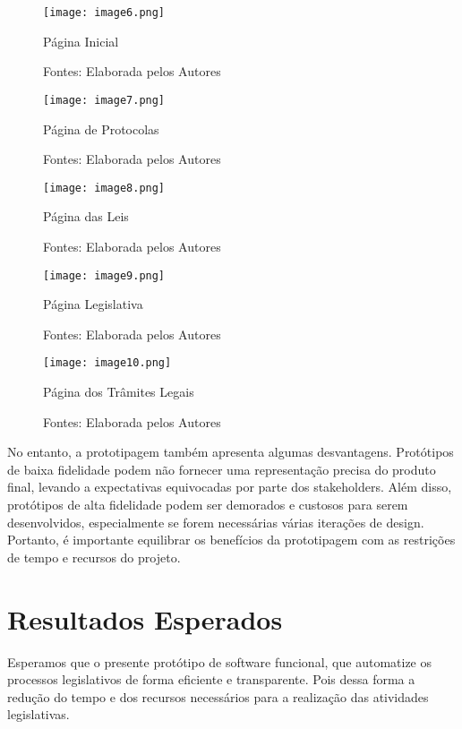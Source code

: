 \documentclass[12pt]{article}
\begin{document}
\begin{figure}[H]
	\centering
	\texttt{[image: image6.png]}
	\caption{Página Inicial}
	\caption*{Fontes: Elaborada pelos Autores}
	\label{fig:pagina-inicial}
\end{figure}

\begin{figure}[H]
	\centering
	\texttt{[image: image7.png]}
	\caption{Página de Protocolas}
	\caption*{Fontes: Elaborada pelos Autores}
	\label{fig:pagina-protocolas}
\end{figure}

\begin{figure}[H]
	\centering
	\texttt{[image: image8.png]}
	\caption{Página das Leis}
	\caption*{Fontes: Elaborada pelos Autores}
	\label{fig:pagina-leis}
\end{figure}

\begin{figure}[H]
	\centering
	\texttt{[image: image9.png]}
	\caption{Página Legislativa}
	\caption*{Fontes: Elaborada pelos Autores}
	\label{fig:pagina-legislativa}
\end{figure}

\begin{figure}[H]
	\centering
	\texttt{[image: image10.png]}
	\caption{Página dos Trâmites Legais}
	\caption*{Fontes: Elaborada pelos Autores}
	\label{fig:pagina-tramites-legais}
\end{figure}

No entanto, a prototipagem também apresenta algumas desvantagens. Protótipos de baixa fidelidade podem não fornecer uma representação precisa do produto final, levando a expectativas equivocadas por parte dos stakeholders. Além disso, protótipos de alta fidelidade podem ser demorados e custosos para serem desenvolvidos, especialmente se forem necessárias várias iterações de design. Portanto, é importante equilibrar os benefícios da prototipagem com as restrições de tempo e recursos do projeto.

\section{Resultados Esperados}

Esperamos que o presente protótipo de software funcional, que automatize os processos legislativos de forma eficiente e transparente. Pois dessa forma a redução do tempo e dos recursos necessários para a realização das atividades legislativas.
\end{document}
